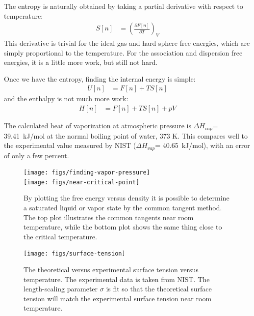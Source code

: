 \documentclass[letterpaper,twocolumn,amsmath,amssymb,prb]{revtex4-1}
\begin{document}
The entropy is naturally obtained by taking a partial derivative with
respect to temperature:
\begin{align}
  S[n] &= \left(\frac{\partial F[n]}{\partial T}\right)_{V}
\end{align}
This derivative is trivial for the ideal gas and hard sphere free
energies, which are simply proportional to the temperature.  For the
association and dispersion free energies, it is a little more work,
but still not hard.

Once we have the entropy, finding the internal energy is simple:
\begin{align}
  U[n] &= F[n] + TS[n]
\end{align}
and the enthalpy is not much more work:
\begin{align}
  H[n] &= F[n] + TS[n] + pV
\end{align}

The calculated heat of vaporization at atmospheric pressure is
$\Delta H_{vap}$= 39.41~kJ/mol at the normal boiling point of water,
373 K. This compares well to the experimental
value measured by NIST ($\Delta H_{vap}$= 40.65~kJ/mol\cite{nistwater}), with 
an error of only a few percent.

\begin{figure}
\begin{center}
\texttt{[image: figs/finding-vapor-pressure]}\\
\texttt{[image: figs/near-critical-point]}
\end{center}
\caption{By plotting the free energy versus density it is possible to
  determine a saturated liquid or vapor state by the common tangent
  method. The top plot illustrates the common tangents near room 
  temperature, while the bottom plot shows the same thing close to the 
  critical temperature. }
\label{fig:homogeneous}
\end{figure}

\begin{figure}
\begin{center}
\texttt{[image: figs/surface-tension]}
\end{center}
\caption{The theoretical versus experimental surface tension
  versus temperature. The experimental data is taken from NIST.\cite{nistwater}
  The length-scaling parameter $\sigma$ is fit so that the theoretical surface tension
  will match the experimental surface tension near room temperature.
}
\label{fig:surface-tension}
\end{figure}
\end{document}
